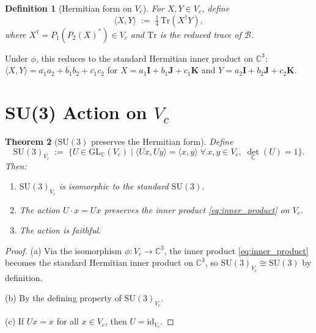\documentclass[12pt,a4paper]{article}
\newtheorem{theorem}{Theorem}[section]
\newtheorem{definition}[theorem]{Definition}
\theoremstyle{remark}
\newcommand{\B}{\mathcal{B}}          %
\newcommand{\C}{\mathbb{C}}
\begin{document}
\begin{definition}[Hermitian form on $V_c$]
  \label{def:inner_product}
  For $X,Y\in V_c$, define
  \begin{equation}
    \label{eq:inner_product}
    \langle X,Y\rangle \;:=\;
    \tfrac{1}{4}\,\mathrm{Tr}(X^\dagger Y),
  \end{equation}
  where $X^\dagger = P_1(P_2(X)^*)\in V_c$ and $\mathrm{Tr}$ is the reduced
  trace of $\B$.
\end{definition}

Under $\phi$, this reduces to the standard Hermitian inner product on $\C^3$:
$\langle X,Y\rangle = \overline{a_1}a_2+\overline{b_1}b_2+\overline{c_1}c_2$
for $X=a_1\mathbf{I}+b_1\mathbf{J}+c_1\mathbf{K}$ and
$Y=a_2\mathbf{I}+b_2\mathbf{J}+c_2\mathbf{K}$.

\section{SU(3) Action on $V_c$}
\label{sec:su3}

\begin{theorem}[$\mathrm{SU}(3)$ preserves the Hermitian form]
  \label{thm:su3_action}
  Define
  \begin{equation}
    \label{eq:SU3_Vc}
    \mathrm{SU}(3)_{V_c} \;:=\;
    \bigl\{U\in\mathrm{GL}_\C(V_c) \;\big|\;
    \langle Ux,Uy\rangle = \langle x,y\rangle\;\forall\,x,y\in V_c,\;
    \det_\C(U)=1\bigr\}.
  \end{equation}
  Then:
  \begin{enumerate}
    \item[(a)] $\mathrm{SU}(3)_{V_c}$ is isomorphic to the standard
      $\mathrm{SU}(3)$.
    \item[(b)] The action $U\cdot x = Ux$ preserves the inner product
      \eqref{eq:inner_product} on $V_c$.
    \item[(c)] The action is faithful.
  \end{enumerate}
\end{theorem}

\begin{proof}
  (a) Via the isomorphism $\phi:V_c\to\C^3$, the inner product
  \eqref{eq:inner_product} becomes the standard Hermitian inner product on
  $\C^3$, so $\mathrm{SU}(3)_{V_c}\cong\mathrm{SU}(3)$ by definition.

  (b) By the defining property of $\mathrm{SU}(3)_{V_c}$.

  (c) If $Ux=x$ for all $x\in V_c$, then $U=\mathrm{id}_{V_c}$.
\end{proof}
\end{document}
